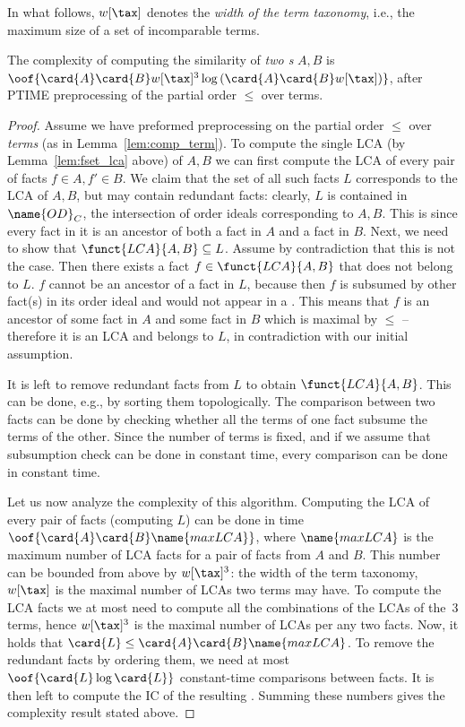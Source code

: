 In what follows, $w[\tax]$ denotes the \emph{width of the term taxonomy}, i.e., the maximum size of a set of incomparable terms.
\vspace{-2mm}
\begin{lemma}
\label{lem:comp_fset}
The complexity of computing the similarity of \emph{two \fset{}s} $A,B$ is $\oof{\card{A}\card{B}w[\tax]^3\log\left(\card{A}\card{B}w[\tax]\right)}$, after PTIME preprocessing of the partial order $\leq$ over terms.
\end{lemma}
\begin{proof}
Assume we have preformed preprocessing on the partial order $\leq$ over \emph{terms} (as in Lemma~\ref{lem:comp_term}). To compute the single LCA (by Lemma~\ref{lem:fset_lca} above) of $A, B$ we can first compute the LCA of every pair of facts $f\in A, f'\in B$. We claim that the set of all such facts $L$ corresponds to the LCA of $A,B$, but may contain redundant facts: clearly, $L$ is contained in $\name{OD}_C$, the intersection of order ideals corresponding to $A,B$. This is since every fact in it is an ancestor of both a fact in $A$ and a fact in $B$. Next, we need to show that $\funct{LCA}{A,B}\subseteq L$. Assume by contradiction that this is not the case. Then there exists a fact $f\in\funct{LCA}{A,B}$ that does not belong to $L$. $f$ cannot be an ancestor of a fact in $L$, because then $f$ is subsumed by other fact(s) in its order ideal and would not appear in a \fset{}. This means that $f$ is an ancestor of some fact in $A$ and some fact in $B$ which is maximal by $\leq$ -- therefore it is an LCA and belongs to $L$, in contradiction with our initial assumption.

It is left to remove redundant facts from $L$ to obtain $\funct{LCA}{A,B}$. This can be done, e.g., by sorting them topologically. The comparison between two facts can be done by checking whether all the terms of one fact subsume the terms of the other. Since the number of terms is fixed, and if we assume that subsumption check can be done in constant time, every comparison can be done in constant time.

Let us now analyze the complexity of this algorithm. Computing the LCA of every pair of facts (computing $L$) can be done in time $\oof{\card{A}\card{B}\name{maxLCA}}$, where $\name{maxLCA}$ is the maximum number of LCA facts for a pair of facts from $A$ and $B$. This number can be bounded from above by $w[\tax]^3$: the width of the term taxonomy, $w[\tax]$ is the maximal number of LCAs two terms may have. To compute the LCA facts we at most need to compute all the combinations of the LCAs of the~3 terms, hence $w[\tax]^3$ is the maximal number of LCAs per any two facts. Now, it holds that $\card{L} \leq \card{A}\card{B}\name{maxLCA}$. To remove the redundant facts by ordering them, we need at most $\oof{\card{L}\log\card{L}}$ constant-time comparisons between facts. It is then left to compute the IC of the resulting \fset{}. Summing these numbers gives the complexity result stated above.
\end{proof}



